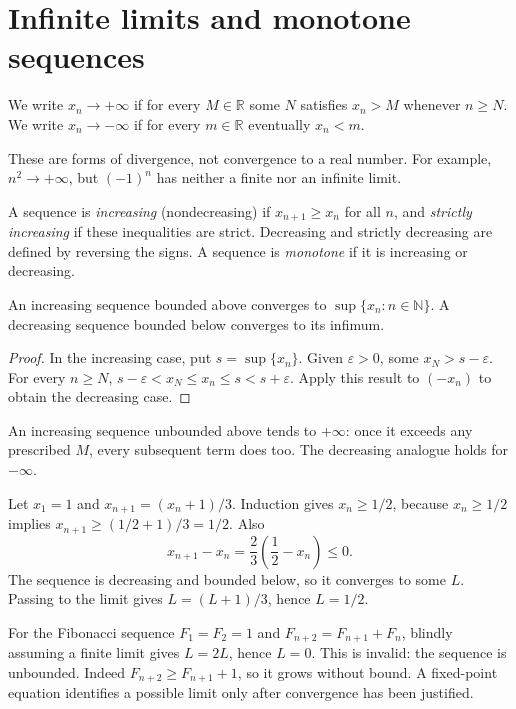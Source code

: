 \section{Infinite limits and monotone sequences}
\begin{definition}
We write $x_n\to+\infty$ if for every $M\in\mathbb R$ some $N$ satisfies
$x_n>M$ whenever $n\geq N$. We write $x_n\to-\infty$ if for every
$m\in\mathbb R$ eventually $x_n<m$.
\end{definition}
These are forms of divergence, not convergence to a real number. For example,
$n^2\to+\infty$, but $(-1)^n$ has neither a finite nor an infinite limit.

\begin{definition}[Monotonicity]
A sequence is \emph{increasing} (nondecreasing) if $x_{n+1}\geq x_n$ for
all $n$, and \emph{strictly increasing} if these inequalities are strict.
Decreasing and strictly decreasing are defined by reversing the signs.
A sequence is \emph{monotone} if it is increasing or decreasing.
\end{definition}

\begin{theorem}\label{thm:analysis-monotone}
An increasing sequence bounded above converges to $\sup\{x_n:n\in\mathbb N\}$.
A decreasing sequence bounded below converges to its infimum.
\end{theorem}
\begin{proof}
In the increasing case, put $s=\sup\{x_n\}$. Given $\varepsilon>0$, some
$x_N>s-\varepsilon$. For every $n\geq N$,
$s-\varepsilon<x_N\leq x_n\leq s<s+\varepsilon$.
Apply this result to $(-x_n)$ to obtain the decreasing case.
\end{proof}
An increasing sequence unbounded above tends to $+\infty$: once it exceeds
any prescribed $M$, every subsequent term does too. The decreasing analogue
holds for $-\infty$.

\begin{example}
Let $x_1=1$ and $x_{n+1}=(x_n+1)/3$. Induction gives $x_n\geq1/2$, because
$x_n\geq1/2$ implies $x_{n+1}\geq(1/2+1)/3=1/2$. Also
\[
x_{n+1}-x_n=\frac23\left(\frac12-x_n\right)\leq0.
\]
The sequence is decreasing and bounded below, so it converges to some $L$.
Passing to the limit gives $L=(L+1)/3$, hence $L=1/2$.
\end{example}
\begin{remark}
For the Fibonacci sequence $F_1=F_2=1$ and $F_{n+2}=F_{n+1}+F_n$, blindly
assuming a finite limit gives $L=2L$, hence $L=0$. This is invalid: the
sequence is unbounded. Indeed $F_{n+2}\geq F_{n+1}+1$, so it grows without
bound. A fixed-point equation identifies a possible limit only after
convergence has been justified.
\end{remark}

